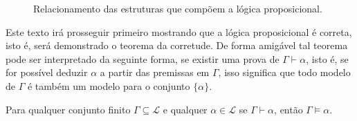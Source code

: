 \begin{figure}[H]
  \centering
  \caption{Relacionamento das estruturas que compõem a lógica proposicional.}
  \label{fig:LogicaProposicional}
\end{figure}

Este texto irá prosseguir primeiro mostrando que a lógica proposicional é correta, isto é, será demonstrado o teorema da corretude. De forma amigável tal teorema pode ser interpretado da seguinte forma, se existir uma prova de $\Gamma \vdash \alpha$, isto é, se for possível deduzir $\alpha$ a partir das premissas em $\Gamma$, isso significa que todo modelo de $\Gamma$ é também um modelo para o conjunto $\{\alpha\}$.

\begin{teorema}\label{teo:CorretudeProposicional}
  Para qualquer conjunto finito $\Gamma \subseteq \mathcal{L}$ e qualquer $\alpha \in \mathcal{L}$ se $\Gamma\vdash \alpha$, então $\Gamma \vDash \alpha$.
\end{teorema}


